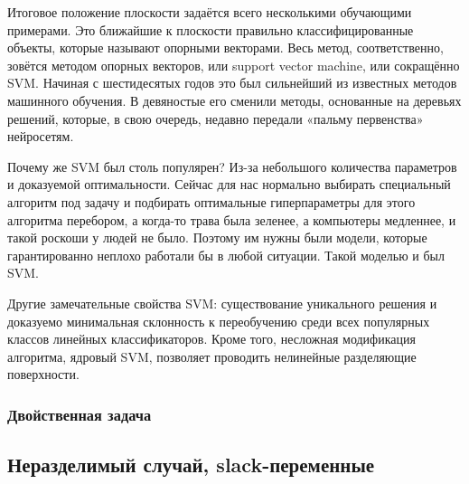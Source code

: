 Итоговое положение плоскости задаётся всего несколькими обучающими примерами.
Это ближайшие к плоскости правильно классифицированные объекты, которые называют опорными векторами.
Весь метод, соответственно, зовётся методом опорных векторов, или support vector machine, или сокращённо SVM\@.
Начиная с шестидесятых годов это был сильнейший из известных методов машинного обучения.
В девяностые его сменили методы, основанные на деревьях решений, которые, в свою очередь, недавно передали «пальму
первенства» нейросетям.

Почему же SVM был столь популярен?
Из-за небольшого количества параметров и доказуемой оптимальности.
Сейчас для нас нормально выбирать специальный алгоритм под задачу и подбирать оптимальные гиперпараметры для этого
алгоритма перебором, а когда-то трава была зеленее, а компьютеры медленнее, и такой роскоши у людей не было.
Поэтому им нужны были модели, которые гарантированно неплохо работали бы в любой ситуации.
Такой моделью и был SVM\@.

Другие замечательные свойства SVM: существование уникального решения и доказуемо минимальная склонность к
переобучению среди всех популярных классов линейных классификаторов.
Кроме того, несложная модификация алгоритма, ядровый SVM, позволяет проводить нелинейные разделяющие поверхности.

\subsubsection{Двойственная задача}

\subsection{Неразделимый случай, slack-переменные}

